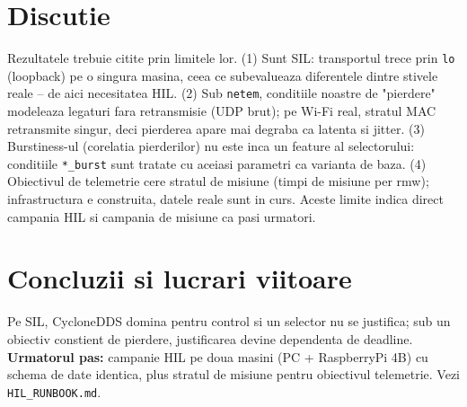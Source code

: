 \documentclass[11pt]{article}
\begin{document}
\section{Discutie}
Rezultatele trebuie citite prin limitele lor. (1) Sunt SIL: transportul trece prin
\texttt{lo} (loopback) pe o singura masina, ceea ce subevalueaza diferentele dintre stivele
reale -- de aici necesitatea HIL. (2) Sub \texttt{netem}, conditiile noastre de "pierdere"
modeleaza legaturi fara retransmisie (UDP brut); pe Wi-Fi real, stratul MAC retransmite
singur, deci pierderea apare mai degraba ca latenta si jitter. (3) Burstiness-ul (corelatia
pierderilor) nu este inca un feature al selectorului: conditiile \texttt{*\_burst} sunt
tratate cu aceiasi parametri ca varianta de baza. (4) Obiectivul de telemetrie cere stratul
de misiune (timpi de misiune per rmw); infrastructura e construita, datele reale sunt in curs.
Aceste limite indica direct campania HIL si campania de misiune ca pasi urmatori.


\section{Concluzii si lucrari viitoare}
Pe SIL, CycloneDDS domina pentru control si un selector nu se justifica; sub un obiectiv
constient de pierdere, justificarea devine dependenta de deadline. \textbf{Urmatorul pas:}
campanie HIL pe doua masini (PC + RaspberryPi 4B) cu schema de date identica, plus stratul de
misiune pentru obiectivul telemetrie. Vezi \texttt{HIL\_RUNBOOK.md}.



\end{document}
